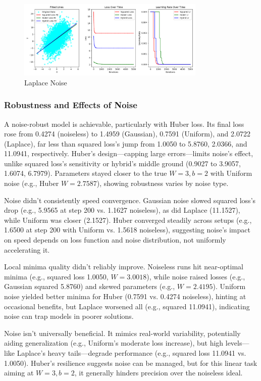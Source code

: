 \documentclass{article}
\begin{document}
\begin{figure}[h]
    \centering
    \includegraphics[width=0.8\textwidth]{assets/laplace_noise.png}
    \caption{Laplace Noise}
    \label{fig:laplace_noise_curve}
\end{figure}

\subsubsection{Robustness and Effects of Noise}

A noise-robust model is achievable, particularly with Huber loss. Its final loss rose from 0.4274 (noiseless) to 1.4959 (Gaussian), 0.7591 (Uniform), and 2.0722 (Laplace), far less than squared loss’s jump from 1.0050 to 5.8760, 2.0366, and 11.0941, respectively. Huber’s design—capping large errors—limits noise’s effect, unlike squared loss’s sensitivity or hybrid’s middle ground (0.9027 to 3.9057, 1.6074, 6.7979). Parameters stayed closer to the true \( W = 3, b = 2 \) with Uniform noise (e.g., Huber \( W = 2.7587 \)), showing robustness varies by noise type.

Noise didn’t consistently speed convergence. Gaussian noise slowed squared loss’s drop (e.g., 5.9565 at step 200 vs. 1.1627 noiseless), as did Laplace (11.1527), while Uniform was closer (2.1527). Huber converged steadily across setups (e.g., 1.6500 at step 200 with Uniform vs. 1.5618 noiseless), suggesting noise’s impact on speed depends on loss function and noise distribution, not uniformly accelerating it.

Local minima quality didn’t reliably improve. Noiseless runs hit near-optimal minima (e.g., squared loss 1.0050, \( W = 3.0018 \)), while noise raised losses (e.g., Gaussian squared 5.8760) and skewed parameters (e.g., \( W = 2.4195 \)). Uniform noise yielded better minima for Huber (0.7591 vs. 0.4274 noiseless), hinting at occasional benefits, but Laplace worsened all (e.g., squared 11.0941), indicating noise can trap models in poorer solutions.

Noise isn’t universally beneficial. It mimics real-world variability, potentially aiding generalization (e.g., Uniform’s moderate loss increase), but high levels—like Laplace’s heavy tails—degrade performance (e.g., squared loss 11.0941 vs. 1.0050). Huber’s resilience suggests noise can be managed, but for this linear task aiming at \( W = 3, b = 2 \), it generally hinders precision over the noiseless ideal.
\end{document}
